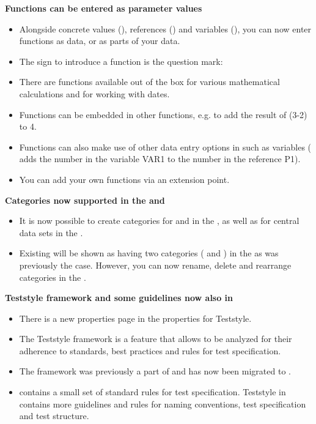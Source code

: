 \textbf{Functions can be entered as parameter values}
\begin{itemize}
\item Alongside concrete values (), references () and variables (), you can now enter functions as data, or as parts of your data.
\item The sign to introduce a function is the question mark: 
\item There are functions available out of the box for various mathematical calculations and for working with dates.  
\item Functions can be embedded in other functions, e.g.  to add the result of (3-2) to 4. 
\item Functions can also make use of other data entry options in \app{} such as variables ( adds the number in the variable VAR1 to the number in the reference P1). 
\item You can add your own functions via an extension point. 
\end{itemize}

\textbf{Categories now supported in the \gdtestsuitebrowser{} and \gddataeditor}\\
\begin{itemize}
\item It is now possible to create categories for \gdsuites{} and \gdjobs{} in the \gdtestsuitebrowser{}, as well as for central data sets in the \gddataeditor{}. 
\item Existing \gdprojects{} will be shown as having two categories ( and ) in the \gdtestsuitebrowser{} as was previously the case. However, you can now rename, delete and rearrange categories in the \gdtestsuitebrowser{}. 
\end{itemize} 

\textbf{Teststyle framework and some guidelines now also in \jb{}}
\begin{itemize}
\item There is a new properties page in the \gdproject{} properties for Teststyle.
\item The Teststyle framework is a feature that allows \gdprojects{} to be analyzed for their adherence to standards, best practices and rules for test specification.
\item The framework was previously a part of \gd{} and has now been migrated to \jb{}. 
\item \jb{} contains a small set of standard rules for test specification. Teststyle in \gd{} contains more guidelines and rules for naming conventions, test specification and test structure. 
\end{itemize}

